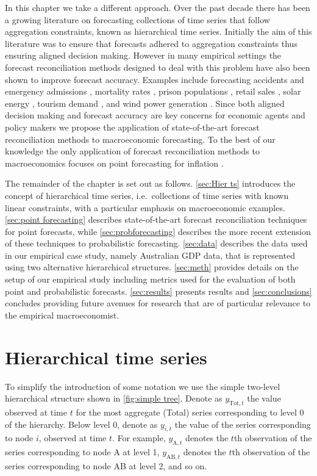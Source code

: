 \documentclass[graybox]{svmult}
\begin{document}
In this chapter we take a different approach. Over the past decade there has been a growing literature on forecasting collections of time series that follow aggregation constraints, known as hierarchical time series. Initially the aim of this literature was to ensure that forecasts adhered to aggregation constraints thus ensuring aligned decision making. However in many empirical settings the forecast reconciliation methods designed to deal with this problem have also been shown to improve forecast accuracy. Examples include forecasting accidents and emergency admissions \citep{AthEtAl2017}, mortality rates \citep{ShaHyn2017}, prison populations \citep{AthEtAl2019}, retail sales \citep{VilPed2018}, solar energy \citep{YanEtAl2017,YagEtAl2019}, tourism demand \citep{AthEtAl2009, HynEtAl2011, WicEtAl2019}, and wind power generation \citep{ZhaDon2018}. Since both aligned decision making and forecast accuracy are key concerns for economic agents and policy makers we propose the application of state-of-the-art forecast reconciliation methods to macroeconomic forecasting. To the best of our knowledge the only application of forecast reconciliation methods to macroeconomics focuses on point forecasting for inflation \citep{capistran2010multi,weiss2018essays}.

The remainder of the chapter is set out as follows. \autoref{sec:Hier ts} introduces the concept of hierarchical time series, i.e.\ collections of time series with known linear constraints, with a particular emphasis on macroeconomic examples. \autoref{sec:point forecasting} describes state-of-the-art forecast reconciliation techniques for point forecasts, while \autoref{sec:probforecasting} describes the more recent extension of these techniques to probabilistic forecasting. \autoref{sec:data} describes the data used in our empirical case study, namely Australian GDP data, that is represented using two alternative hierarchical structures. \autoref{sec:meth} provides details on the setup of our empirical study including metrics used for the evaluation of both point and probabilistic forecasts. \autoref{sec:results} presents results and \autoref{sec:conclusions} concludes providing future avenues for research that are of particular relevance to the empirical macroeconomist.

\section{Hierarchical time series}\label{sec:Hier ts}

To simplify the introduction of some notation we use the simple two-level hierarchical structure shown in \autoref{fig:simple tree}. Denote as $y_{\text{Tot},t}$ the value observed at time $t$ for the most aggregate (Total) series corresponding to level 0 of the hierarchy. Below level 0, denote as $y_{i,t}$ the value of the series corresponding to node $i$, observed at time $t$. For example, $y_{\text{A},t}$ denotes the $t$th observation of the series corresponding to node A at level 1, $y_{\text{AB},t}$ denotes the $t$th observation of the series corresponding to node AB at level 2, and so on.
\end{document}
